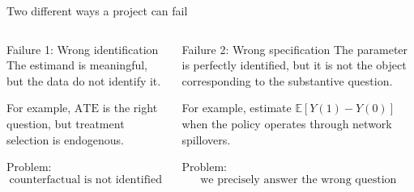 \documentclass[aspectratio=169,11pt]{beamer}
\newcommand{\E}{\mathbb{E}}
\newcommand{\ATE}{\mathrm{ATE}}
\begin{document}
\begin{frame}{Two different ways a project can fail}

\begin{columns}[T]


\begin{block}{Failure 1: Wrong identification}
The estimand is meaningful, but the data do not identify it.

For example, $\ATE$ is the right question, but treatment selection
is endogenous.

\vspace{0.35em}

Problem:
\[
\boxed{\text{counterfactual is not identified}}
\]

\end{block}


\begin{block}{Failure 2: Wrong specification}
The parameter is perfectly identified, but it is not the object
corresponding to the substantive question.

For example, estimate $\E[Y(1)-Y(0)]$ when the policy operates
through network spillovers.

\vspace{0.35em}

Problem:
\[
\boxed{\text{we precisely answer the wrong question}}
\]

\end{block}

\end{columns}

\end{frame}
\end{document}
